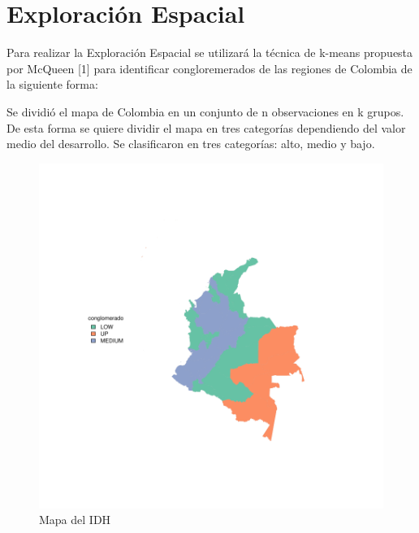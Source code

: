\documentclass{article}
\begin{document}
\clearpage

\section{Exploraci\'on Espacial}

Para realizar la Exploraci\'on Espacial se utilizar\'a la t\'ecnica de k-means propuesta por McQueen [1] para identificar congloremerados de las regiones de Colombia de la siguiente forma:

Se dividi\'o el mapa de Colombia en un conjunto de n observaciones en k grupos. De esta forma se quiere dividir el mapa en tres categor\'ias dependiendo del valor medio del desarrollo. Se clasificaron en tres categor\'ias: alto, medio y bajo.







\begin{figure}[h]
\centering

\includegraphics{FinaldeR3-plotMap1}

\caption{Mapa del IDH}
\label{map}
\end{figure}


\renewcommand{\refname}{Bibliografia}

\cite{bibliografia}
\end{document}
